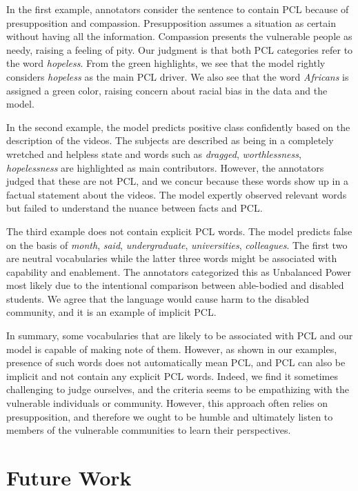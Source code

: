 \documentclass[11pt]{article}
\begin{document}
In the first example, annotators consider the sentence to contain PCL because of presupposition and compassion. Presupposition assumes a situation as certain without having all the information. Compassion presents the vulnerable people as needy, raising a feeling of pity. Our judgment is that both PCL categories refer to the word \textit{hopeless}. From the green highlights, we see that the model rightly considers \textit{hopeless} as the main PCL driver. We also see that the word \textit{Africans} is assigned a green color, raising concern about racial bias in the data and the model.

In the second example, the model predicts positive class confidently based on the description of the videos. The subjects are described as being in a completely wretched and helpless state and words such as \textit{dragged}, \textit{worthlessness}, \textit{hopelessness} are highlighted as main contributors. However, the annotators judged that these are not PCL, and we concur because these words show up in a factual statement about the videos. The model expertly observed relevant words but failed to understand the nuance between facts and PCL.

The third example does not contain explicit PCL words. The model predicts false on the basis of \textit{month}, \textit{said}, \textit{undergraduate}, \textit{universities}, \textit{colleagues}. The first two are neutral vocabularies while the latter three words might be associated with capability and enablement. The annotators categorized this as Unbalanced Power most likely due to the intentional comparison between able-bodied and disabled students. We agree that the language would cause harm to the disabled community, and it is an example of implicit PCL.

In summary, some vocabularies that are likely to be associated with PCL and our model is capable of making note of them. However, as shown in our examples, presence of such words does not automatically mean PCL, and PCL can also be implicit and not contain any explicit PCL words. Indeed, we find it sometimes challenging to judge ourselves, and the criteria seems to be empathizing with the vulnerable individuals or community. However, this approach often relies on presupposition, and therefore we ought to be humble and ultimately listen to members of the vulnerable communities to learn their perspectives.

\section{Future Work}
\end{document}
